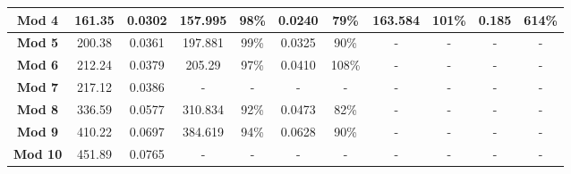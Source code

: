 \begin{table}[]
{\begin{tabular}{@{}c|c|c|cccc|cccc@{}}
		\textbf{Mod 4}        & 161.35                                                             & 0.0302                                                                 & 157.995           & 98\%              & 0.0240           & 79\%              & 163.584           & 101\%             & 0.185            & 614\%             \\ \midrule
		\textbf{Mod 5}        & 200.38                                                             & 0.0361                                                                 & 197.881           & 99\%              & 0.0325           & 90\%              & -                 & -                 & -                & -                 \\ \midrule
		\textbf{Mod 6}        & 212.24                                                             & 0.0379                                                                 & 205.29            & 97\%              & 0.0410           & 108\%             & -                 & -                 & -                & -                 \\ \midrule
		\textbf{Mod 7}        & 217.12                                                             & 0.0386                                                                 & -                 & -                 & -                & -                 & -                 & -                 & -                & -                 \\ \midrule
		\textbf{Mod 8}        & 336.59                                                             & 0.0577                                                                 & 310.834           & 92\%              & 0.0473           & 82\%              & -                 & -                 & -                & -                 \\ \midrule
		\textbf{Mod 9}        & 410.22                                                             & 0.0697                                                                 & 384.619           & 94\%              & 0.0628           & 90\%              & -                 & -                 & -                & -                 \\ \midrule
		\textbf{Mod 10}       & 451.89                                                             & 0.0765                                                                 & -                 & -                 & -                & -                 & -                 & -                 & -                & -                 \\ \bottomrule
	\end{tabular}}
\end{table}